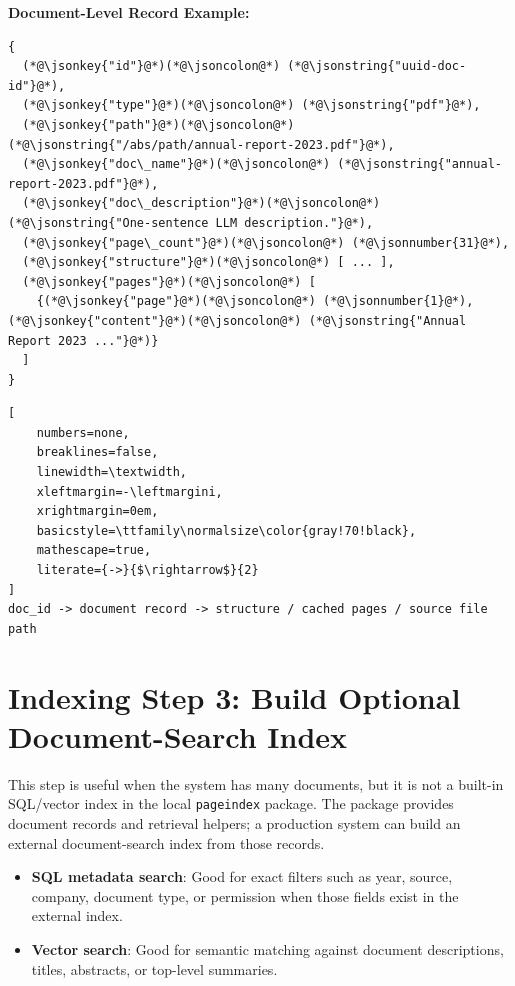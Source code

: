 \documentclass[11pt,a4paper]{article}
\newcommand{\jsonkey}[1]{\textcolor{blue!70!black}{\texttt{#1}}}
\newcommand{\jsonstring}[1]{\textcolor{green!45!black}{\texttt{#1}}}
\newcommand{\jsonnumber}[1]{\textcolor{orange!85!black}{\texttt{#1}}}
\begin{document}
\noindent\textbf{\large Document-Level Record Example:}
\begin{lstlisting}[style=pageindexjson,breaklines=true,basicstyle=\ttfamily\footnotesize\color{gray!80!black}]
{
  (*@\jsonkey{"id"}@*)(*@\jsoncolon@*) (*@\jsonstring{"uuid-doc-id"}@*),
  (*@\jsonkey{"type"}@*)(*@\jsoncolon@*) (*@\jsonstring{"pdf"}@*),
  (*@\jsonkey{"path"}@*)(*@\jsoncolon@*) (*@\jsonstring{"/abs/path/annual-report-2023.pdf"}@*),
  (*@\jsonkey{"doc\_name"}@*)(*@\jsoncolon@*) (*@\jsonstring{"annual-report-2023.pdf"}@*),
  (*@\jsonkey{"doc\_description"}@*)(*@\jsoncolon@*) (*@\jsonstring{"One-sentence LLM description."}@*),
  (*@\jsonkey{"page\_count"}@*)(*@\jsoncolon@*) (*@\jsonnumber{31}@*),
  (*@\jsonkey{"structure"}@*)(*@\jsoncolon@*) [ ... ],
  (*@\jsonkey{"pages"}@*)(*@\jsoncolon@*) [
    {(*@\jsonkey{"page"}@*)(*@\jsoncolon@*) (*@\jsonnumber{1}@*), (*@\jsonkey{"content"}@*)(*@\jsoncolon@*) (*@\jsonstring{"Annual Report 2023 ..."}@*)}
  ]
}
\end{lstlisting}

\begin{lstlisting}[
    numbers=none,
    breaklines=false,
    linewidth=\textwidth,
    xleftmargin=-\leftmargini,
    xrightmargin=0em,
    basicstyle=\ttfamily\normalsize\color{gray!70!black},
    mathescape=true,
    literate={->}{$\rightarrow$}{2}
]
doc_id -> document record -> structure / cached pages / source file path
\end{lstlisting}

\section{Indexing Step 3: Build Optional Document-Search Index}

This step is useful when the system has many documents, but it is not a built-in SQL/vector index in the local \texttt{pageindex} package. The package provides document records and retrieval helpers; a production system can build an external document-search index from those records.

\begin{itemize}
    \item \textbf{SQL metadata search}: Good for exact filters such as year, source, company, document type, or permission when those fields exist in the external index.
    \item \textbf{Vector search}: Good for semantic matching against document descriptions, titles, abstracts, or top-level summaries.
\end{itemize}
\end{document}

